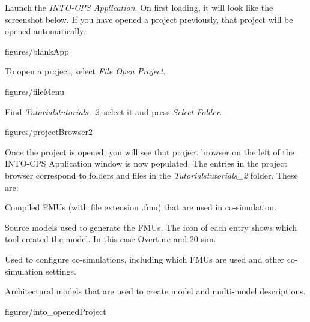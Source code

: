 \documentclass[11pt,a4paper]{../tutorial}
\begin{document}
\begin{instructions}
\item Launch the \emph{INTO-CPS Application}. On first loading, it will look like the screenshot below. If you have opened a project previously, that project will be opened automatically.

\begin{annotation}[width=0.85\linewidth]{figures/blankApp}
\end{annotation}

\item To open a project, select \emph{File \menusep Open Project}.

\begin{annotation}[width=0.85\linewidth,trim=0 260 0 0,clip]{figures/fileMenu}
\end{annotation}

\item Find \emph{Tutorials\pathsep{}tutorials\_2}, select it and press \emph{Select Folder}.

\begin{annotation}[width=0.85\linewidth]{figures/projectBrowser2}
\end{annotation}

\item Once the project is opened, you will see that project browser on the left of the INTO-CPS Application window is now populated. The entries in the project browser correspond to folders and files in the \emph{Tutorials\pathsep{}tutorials\_2} folder. These are:

    \begin{description}[noitemsep]
        \item[FMUs] Compiled FMUs (with file extension .fmu) that are used in co-simulation.
        \item[Models] Source models used to generate the FMUs. The icon of each entry shows which tool created the model. In this case Overture and 20-sim.
        \item[Multi-models] Used to configure co-simulations, including which FMUs are used and other co-simulation settings.
        \item[SysML] Architectural models that are used to create model and multi-model descriptions.
    \end{description}

    \begin{annotation}[height=0.64\linewidth,trim=0 0 250 0,clip]{figures/into_openedProject}
    \end{annotation}

\end{instructions}
\end{document}
